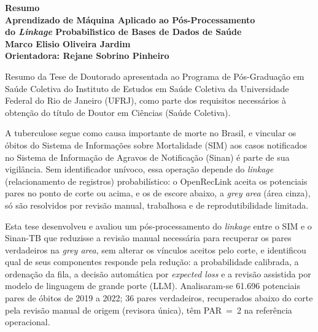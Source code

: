 \documentclass[12pt,a4paper,openany]{book}
\begin{document}
\vspace*{20pt}
\begin{center}
{\LARGE\bf Resumo}\\
\vspace{15pt}
{\Large\bf Aprendizado de M\'aquina Aplicado ao P\'os-Processamento\\do \textit{Linkage} Probabil\'{\i}stico de Bases de Dados de Sa\'ude}\\
\vspace{6pt}
{\bf Marco Elisio Oliveira Jardim}\\
\vspace{12pt}
{\bf Orientadora: Rejane Sobrino Pinheiro}\\
\vspace{20pt}
\parbox{14cm}{Resumo da Tese de Doutorado apresentada ao Programa de Pós-Graduação em Saúde Coletiva do Instituto de Estudos em Saúde Coletiva da Universidade Federal do Rio de Janeiro (UFRJ), como parte dos requisitos necessários à obtenção do título de Doutor em Ciências (Saúde Coletiva).}
\end{center}
\vspace*{35pt}

A tuberculose segue como causa importante de morte no Brasil, e vincular os óbitos do Sistema de Informações sobre Mortalidade (SIM) aos casos notificados no Sistema de Informação de Agravos de Notificação (Sinan) é parte de sua vigilância. Sem identificador unívoco, essa operação depende do \textit{linkage} (relacionamento de registros) probabilístico: o OpenRecLink aceita os potenciais pares no ponto de corte ou acima, e os de escore abaixo, a \textit{grey area} (área cinza), só são resolvidos por revisão manual, trabalhosa e de reprodutibilidade limitada.

Esta tese desenvolveu e avaliou um pós-processamento do \textit{linkage} entre o SIM e o Sinan-TB que reduzisse a revisão manual necessária para recuperar os pares verdadeiros na \textit{grey area}, sem alterar os vínculos aceitos pelo corte, e identificou qual de seus componentes responde pela redução: a probabilidade calibrada, a ordenação da fila, a decisão automática por \textit{expected loss} e a revisão assistida por modelo de linguagem de grande porte (LLM). Analisaram-se 61.696 potenciais pares de óbitos de 2019 a 2022; 36 pares verdadeiros, recuperados abaixo do corte pela revisão manual de origem (revisora única), têm PAR~=~2 na referência operacional.
\end{document}
